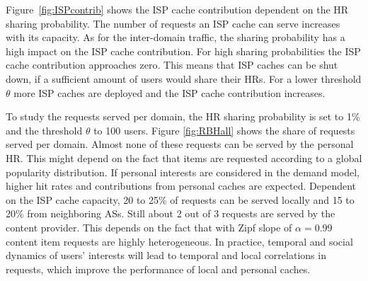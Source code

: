 Figure~\ref{fig:ISPcontrib} shows the ISP cache contribution dependent on the HR sharing probability. The number of requests an ISP cache can serve increases with its capacity. As for the inter-domain traffic, the sharing probability has a high impact on the ISP cache contribution. For high sharing probabilities the ISP cache contribution approaches zero. This means that ISP caches can be shut down, if a sufficient amount of users would share their HRs.
For a lower threshold $\theta$ more ISP caches are deployed and the ISP cache contribution increases.


To study the requests served per domain, the HR sharing probability is set to 1\% and the threshold $\theta$ to 100 users.
Figure \ref{fig:RBHall} shows the share of requests served per domain. Almost none of these requests can be served by the personal HR. This might depend on the fact that items are requested according to a global popularity distribution.
If personal interests are considered in the demand model, higher hit rates and contributions from personal caches are expected. Dependent on the ISP cache capacity, 20 to 25\% of requests can be served locally and 15 to 20\% from neighboring ASs. Still about 2 out of 3 requests are served by the content provider. This depends on the fact that with Zipf slope of $\alpha = 0.99$ content item requests are highly heterogeneous. In practice, temporal and social dynamics of users' interests will lead to temporal and local correlations in requests, which improve the performance of local and personal caches.
